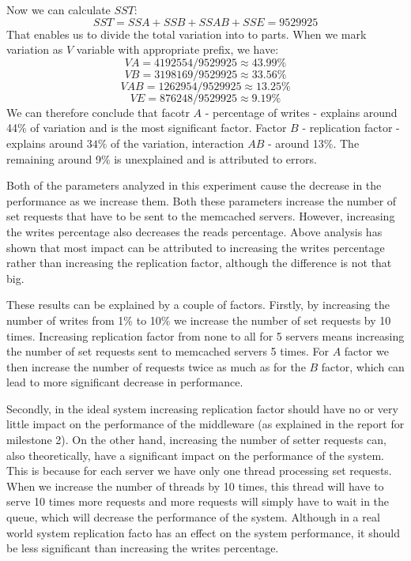 \documentclass[11pt]{article}
\begin{document}
Now we can calculate $SST$:
$$SST = SSA + SSB + SSAB + SSE = 9529925$$
That enables us to divide the total variation into to parts. When we mark variation as $V$ variable with appropriate prefix, we have:
$$VA =  4192554/ 9529925 \approx 43.99\%$$
$$VB =  3198169 / 9529925 \approx 33.56\%$$
$$VAB =  1262954 / 9529925 \approx 13.25\%$$
$$VE =  876248 / 9529925 \approx 9.19\%$$
We can therefore conclude that facotr $A$ - percentage of writes - explains around 44\% of variation and is the most significant factor. Factor $B$ - replication factor - explains  around $34\%$ of the variation, interaction $AB$ - around 13\%. The remaining around 9\% is unexplained and is attributed to errors.

Both of the parameters analyzed in this experiment cause the decrease in the performance as we increase them. Both these parameters increase the number of set requests that have to be sent to the memcached servers. However, increasing the writes percentage also decreases the reads percentage. Above analysis has shown that most impact can be attributed to increasing the writes percentage rather than increasing the replication factor, although the difference is not that big.

These results can be explained by a couple of factors. Firstly, by increasing the number of writes from 1\% to 10\% we increase the number of set requests by 10 times. Increasing replication factor from none to all for 5 servers means increasing the number of set requests sent to memcached servers 5 times. For $A$ factor we then increase the number of requests twice as much as for the $B$ factor, which can lead to more significant decrease in performance.

Secondly, in the ideal system increasing replication factor should have no or very little impact on the performance of the middleware (as explained in the report for milestone 2). On the other hand, increasing the number of setter requests can, also theoretically, have a significant impact on the performance of the system. This is because for each server we have only one thread processing set requests. When we increase the number of threads by 10 times, this thread will have to serve 10 times more requests and more requests will simply have to wait in the queue, which will decrease the performance of the system. Although in a real world system replication facto has an effect on the system performance, it should be less significant than increasing the writes percentage. 
\end{document}
